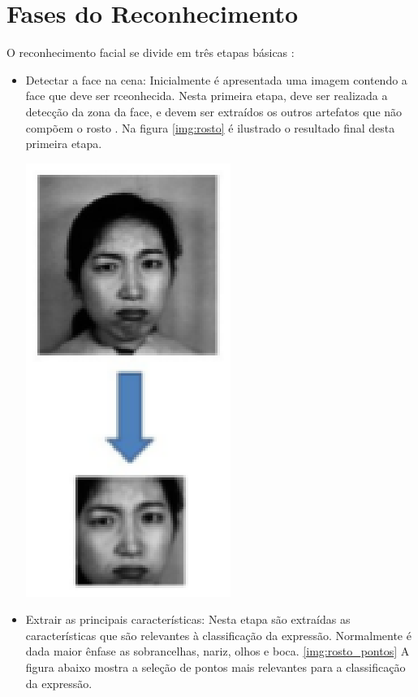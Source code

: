 \section{Fases do Reconhecimento}
O reconhecimento facial se divide em três etapas básicas \cite{Elizabeth}:
\begin{itemize}
\item Detectar a face na cena: Inicialmente é apresentada uma imagem contendo a face que deve ser rceonhecida. Nesta primeira etapa, deve ser realizada a detecção da zona da face, e devem ser extraídos os outros artefatos que não compõem o rosto \cite{FernandoGil}.
Na figura \ref{img:rosto} é ilustrado o resultado final desta primeira etapa.
\begin{center} 
	\includegraphics[scale=0.5]{graficos/rosto}
	\label{img:rosto}
	\cite{Elizabeth}
\end{center}
\item Extrair as principais características: Nesta etapa são extraídas as características que são relevantes à classificação da expressão. Normalmente é dada maior ênfase as sobrancelhas, nariz, olhos e boca. \ref{img:rosto_pontos}
A figura abaixo mostra a seleção de pontos mais relevantes para a classificação da expressão. 
\begin{center}

\end{center}
\end{itemize}
